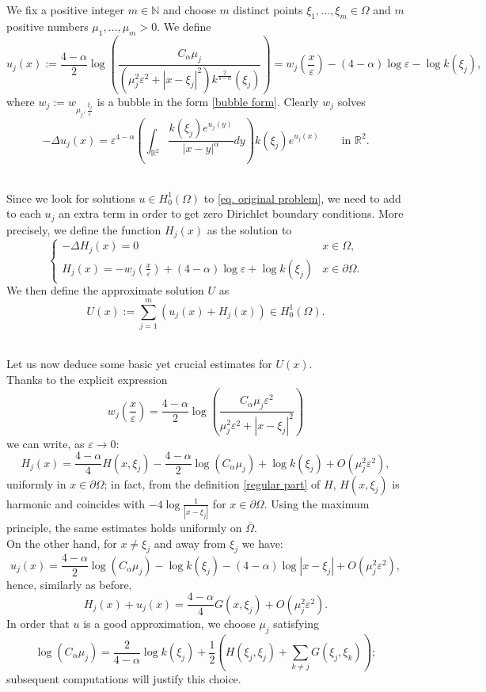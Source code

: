 \documentclass[11pt]{article}
\begin{document}
We fix a positive integer $m\in\mathbb N$ and choose $m$ distinct points $\xi_1,\dots,\xi_m\in\Omega$ and $m$ positive numbers $\mu_1,\dots,\mu_m>0$. We define
$$u_j(x):=\frac{4-\alpha}2\log\left(\frac{C_\alpha\mu_j}{\left(\mu_j^2\varepsilon^2+|x-\xi_j|^2\right)k^{\frac2{4-\alpha}}(\xi_j)}\right)=w_j\left(\frac x\varepsilon\right)-(4-\alpha)\log\varepsilon-\log k(\xi_j),$$
where $w_j:=w_{\mu_j,\frac{\xi_j}\varepsilon}$ is a bubble in the form \eqref{bubble form}. Clearly $w_j$ solves
$$-\Delta u_j(x)=\varepsilon^{4-\alpha}\left(\int_{\mathbb R^2}\frac{k(\xi_j)e^{u_j(y)}}{|x-y|^\alpha}dy\right)k(\xi_j)e^{u_j(x)}\qquad\text{in }\mathbb R^2.$$\

Since we look for solutions $u\in H^1_0(\Omega)$ to \eqref{eq. original problem}, we need to add to each $u_j$ an extra term in order to get zero Dirichlet boundary conditions. More precisely, we define the function $H_j(x)$ as the solution to
$$\left\{\begin{array}{ll}-\Delta H_j(x)=0&x\in\Omega,\\H_j(x)=-w_j\left(\frac x\varepsilon\right)+(4-\alpha)\log\varepsilon+\log k(\xi_j)&x\in\partial\Omega.\end{array}\right.$$
We then define the approximate solution $U$ as
$$\boxed{U(x):=\sum_{j=1}^m(u_j(x)+H_j(x))\in H^1_0(\Omega).}$$\

Let us now deduce some basic yet crucial estimates for $U(x)$.\\
Thanks to the explicit expression
$$w_j\left(\frac x\varepsilon\right)=\frac{4-\alpha}2\log\left(\frac{C_\alpha\mu_j\varepsilon^2}{\mu_j^2\varepsilon^2+|x-\xi_j|^2}\right)$$
we can write, as $\varepsilon\to0$:
\begin{equation}\label{eq.estimate of Hj}
H_j(x)=\frac{4-\alpha}4H(x,\xi_j)-\frac{4-\alpha}2\log(C_\alpha\mu_j)+\log k(\xi_j)+O\left(\mu_j^2\varepsilon^2\right),
\end{equation}
uniformly in $x\in\partial\Omega$; in fact, from the definition \eqref{regular part} of $H$, $H(x,\xi_j)$ is harmonic and coincides with $-4\log\frac1{|x-\xi_j|}$ for $x\in\partial\Omega$. Using the maximum principle, the same estimates holds uniformly on $\overline\Omega$.\\
On the other hand, for $x\ne \xi_j$ and away from $\xi_j$ we have:
$$u_j(x)=\frac{4-\alpha}2\log(C_\alpha\mu_j)-\log k(\xi_j)-(4-\alpha)\log|x-\xi_j|+O\left(\mu_j^2\varepsilon^2\right),$$
hence, similarly as before,
\begin{equation}\label{eq.estimate of mu}
H_j(x)+u_j(x)=\frac{4-\alpha}4G(x,\xi_j)+O\left(\mu_j^2\varepsilon^2\right).
\end{equation}
In order that $u$ is a good approximation, we choose $\mu_j$ satisfying
\begin{equation}\label{eq. definition of mu}
\log(C_\alpha\mu_j)=\frac2{4-\alpha}\log k(\xi_j)+\frac12\left(H(\xi_j,\xi_j)+\sum_{k\ne j}G(\xi_j,\xi_k)\right);
\end{equation}
subsequent computations will justify this choice.\\
\end{document}
